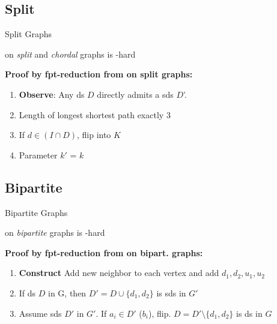 \subsection{Split}
\begin{frame}[c]{Split Graphs}

    \begin{tcolorbox}[colback=TUMBlueLighter]
        \sdom on \textit{split} and \textit{chordal} graphs is \WTWOhs-hard
    \end{tcolorbox}

    \pause\begin{figure}[!ht]
    \end{figure}

    \textbf{Proof by  fpt-reduction from \dom on split graphs:}

    \begin{enumerate}
      \pause  \item \textbf{Observe}: Any ds $D$ directly admits a sds $D$'.
      \pause  \item Length of longest shortest path exactly $3$
      \pause  \item If $d \in (I \cap D)$, flip into $K$
      \pause  \item Parameter $k'$ = $k$
    \end{enumerate}

\end{frame}

\subsection{Bipartite}
\begin{frame}[c]{Bipartite Graphs}

    \begin{tcolorbox}[colback=TUMBlueLighter]
        \sdom on \textit{bipartite} graphs is \WTWOhs-hard
    \end{tcolorbox}

    \pause\begin{figure}[!ht]
    \end{figure}

    \textbf{Proof by fpt-reduction from \dom on bipart. graphs:}

    \begin{enumerate}
     \pause   \item \textbf{Construct } Add new neighbor to each vertex and add $d_1,d_2,u_1,u_2$
     \pause   \item If ds $D$ in G, then $D' = D \cup \{d_1,d_2\}$ is sds in $G'$
     \pause   \item Assume sds $D'$ in $G'$. If $a_i \in D'$ ($b_i$), flip. $D = D' \setminus \{d_1,d_2\}$ is ds in $G$
    \end{enumerate}

    \end{frame}




